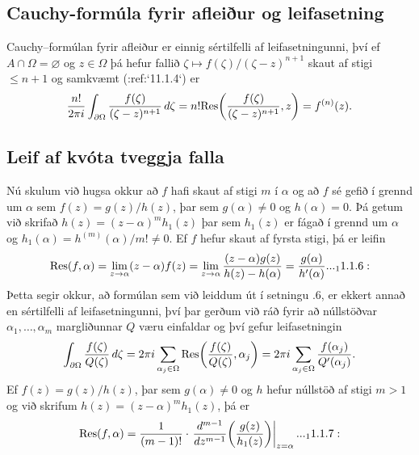 \subsection*{Cauchy-formúla fyrir afleiður og leifasetning}

Cauchy--formúlan fyrir afleiður er einnig sértilfelli af
leifasetningunni, því ef $A\cap \Omega=\varnothing$ og $z\in \Omega$
þá hefur fallið $\zeta\mapsto f(\zeta)/(\zeta-z)^{n+1}$ skaut af
stigi $\leq n+1$ og samkvæmt (:ref:`11.1.4`) er 
 $$\dfrac{n!}{2\pi i}
\int_{\partial\Omega}\dfrac{f(\zeta)}{(\zeta-z)^{n+1}}\, d\zeta = 
{n!} {\operatorname{Res}}\bigg(\dfrac{f(\zeta)}{(\zeta-z)^{n+1}},z\bigg) =
f^{(n)}(z).
 $$

\subsection*{Leif af kvóta tveggja falla}


Nú skulum  við hugsa okkur að $f$ hafi skaut af stigi  $m$ í
$\alpha$ og að $f$ sé gefið í 
grennd um $\alpha$ sem $f(z)=g(z)/h(z)$, þar sem $g(\alpha)\neq
0$ og $h(\alpha)=0$.  Þá getum við skrifað $h(z)=(z-\alpha)^mh_1(z)$ þar
sem $h_1(z)$ er fágað í grennd um $\alpha$ og
$h_1(\alpha)=h^{(m)}(\alpha)/m!\neq 0$. Ef  $f$ hefur skaut af fyrsta
stigi, þá er leifin 
 \begin{equation*}\Res(f,\alpha)= \lim_{z\to \alpha}(z-\alpha) f(z)
=\lim_{z\to \alpha} 
\dfrac{(z-\alpha)g(z)}{h(z)-h(\alpha)}=\dfrac{g(\alpha)}{h\dash(\alpha)}.


.. _11.1.6:

 \end{equation*}
Þetta segir okkur, að 
formúlan sem við leiddum út í setningu .6, 
er ekkert annað en sértilfelli af leifasetningunni, því þar gerðum við 
ráð fyrir að núllstöðvar $\alpha_1,\dots,\alpha_m$ margliðunnar $Q$
væru einfaldar og því gefur leifasetningin
 $$\int_{\partial\Omega}\dfrac{f(\zeta)}{Q(\zeta)}\, d\zeta
=  2\pi i\sum_{\alpha_j\in \Omega}
{\operatorname{Res}}\bigg(\dfrac{f(\zeta)}{Q(\zeta)}, \alpha_j\bigg) 
=  2\pi i\sum_{\alpha_j\in \Omega} \dfrac{f(\alpha_j)}{Q{\sp{\prime}}(\alpha_j)}.
 $$
Ef $f(z)=g(z)/h(z)$, þar sem $g(\alpha)\neq
0$ og $h$ hefur núllstöð af stigi  $m>1$ og við skrifum
$h(z)=(z-{\alpha})^mh_1(z)$, þá er
 \begin{equation*}\Res(f,\alpha)=\dfrac 1{(m-1)!}\cdot
\left.\dfrac {d^{m-1}}{dz^{m-1}}\bigg(\dfrac
{g(z)}{h_1(z)}\bigg)\right|_{z=\alpha}. 

.. _11.1.7:

 \end{equation*}


